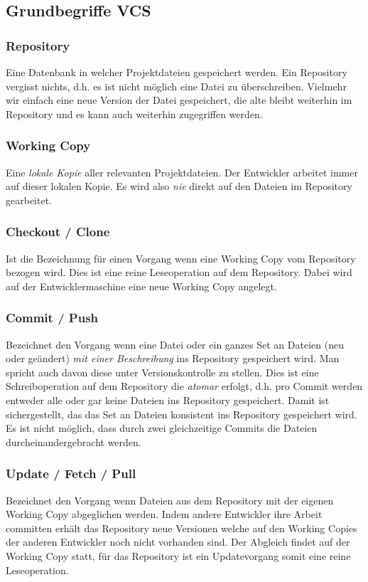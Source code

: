 \documentclass[10pt]{article}
\begin{document}
    \subsection{Grundbegriffe VCS}
    \subsubsection{Repository}
    Eine Datenbank in welcher Projektdateien gespeichert werden. Ein Repository vergisst nichts, d.h. es ist nicht m\"oglich eine Datei zu \"uberschreiben. Vielmehr wir einfach eine neue Version der Datei gespeichert, die alte bleibt weiterhin im Repository und es kann auch weiterhin zugegriffen werden.
    \subsubsection{Working Copy}
    Eine \textit{lokale Kopie} aller relevanten Projektdateien. Der Entwickler arbeitet immer auf dieser lokalen Kopie. Es wird also \textit{nie} direkt auf den Dateien im Repository gearbeitet.
    \subsubsection{Checkout / Clone}
    Ist die Bezeichnung f\"ur einen Vorgang wenn eine Working Copy vom Repository bezogen wird. Dies ist eine reine Leseoperation auf dem Repository. Dabei wird auf der Entwicklermaschine eine neue Working Copy angelegt.
    \subsubsection{Commit / Push}
    Bezeichnet den Vorgang wenn eine Datei oder ein ganzes Set an Dateien (neu oder ge\"andert) \textit{mit einer Beschreibung} ins Repository gespeichert wird. Man spricht auch davon diese unter Versionskontrolle zu stellen. Dies ist eine Schreiboperation auf dem Repository die \textit{atomar} erfolgt, d.h. pro Commit werden entweder alle oder gar keine Dateien ins Repository gespeichert. Damit ist sichergestellt, das das Set an Dateien konsistent ins Repository gespeichert wird. Es ist nicht m\"oglich, dass durch zwei gleichzeitige Commits die Dateien durcheinandergebracht werden.
    \subsubsection{Update / Fetch / Pull}
    Bezeichnet den Vorgang wenn Dateien aus dem Repository mit der eigenen Working Copy abgeglichen werden. Indem andere Entwickler ihre Arbeit committen erh\"alt das Repository neue Versionen welche auf den Working Copies der anderen Entwickler noch nicht vorhanden sind. Der Abgleich findet auf der Working Copy statt, f\"ur das Repository ist ein Updatevorgang somit eine reine Leseoperation.
\end{document}
